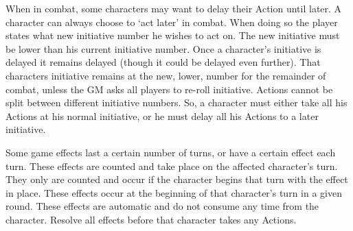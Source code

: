 \documentclass[twoside]{book}
\begin{document}
    {  
     When in combat, some characters may want to delay
             their Action until later. A character can always choose to
             `act later' in combat. When doing so the player
             states what new initiative number he wishes to act on. The
             new initiative must be lower than his current initiative
             number. Once a character's initiative is delayed it
             remains delayed (though it could be delayed even further).
             That characters initiative remains at the new, lower, number
             for the remainder of combat, unless the GM asks all players
             to re-roll initiative. Actions cannot be split between
             different initiative numbers. So, a character must either
             take all his Actions at his normal initiative, or he must
             delay all his Actions to a later initiative. 
    }
  
  

  

  
    {  
     Some game effects last a certain number of turns, or
             have a certain effect each turn. These effects are counted
             and take place on the affected character's turn. They
             only are counted and occur if the character begins that turn
             with the effect in place. These effects occur at the
             beginning of that character's turn in a given round.
             These effects are automatic and do not consume any time from
             the character. Resolve all effects before that character
             takes any Actions. 
    }
  
  

  
\end{document}
